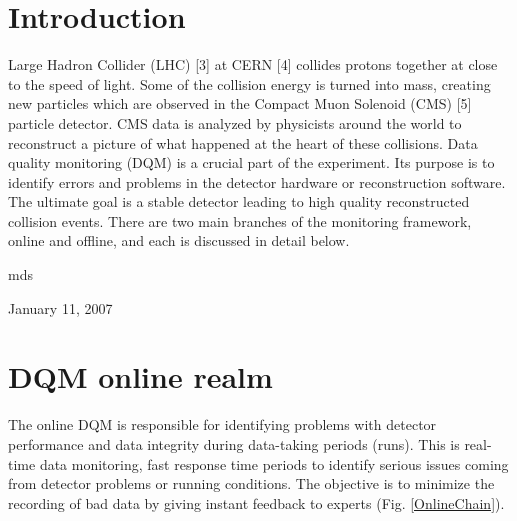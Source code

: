 \documentclass[journal]{IEEEtran}
\begin{document}
\section{Introduction}
% 
% 
% 
% 
 Large Hadron Collider (LHC) [3] at CERN [4] collides protons together at close to the speed of light. Some of the collision energy is turned into mass, creating new particles which are observed in the Compact Muon Solenoid (CMS) [5] particle detector. CMS data is analyzed by physicists around the world to reconstruct a picture of what happened at the heart of these collisions. Data quality monitoring (DQM) is a crucial part of the experiment. Its purpose is to identify errors and problems in the detector hardware or reconstruction software. The ultimate goal is a stable detector leading to high quality reconstructed collision events. There are two main branches of the monitoring framework, online and offline, and each is discussed in detail below.

\hfill mds
 
\hfill January 11, 2007


\section{DQM online realm}
The online DQM is responsible for identifying problems with detector performance and data integrity during data-taking periods (runs). This is real-time data monitoring, fast response time periods to identify serious issues coming from detector problems or running conditions. The objective is to minimize the recording of bad data by giving instant feedback to experts (Fig. \ref{OnlineChain}).
\end{document}
